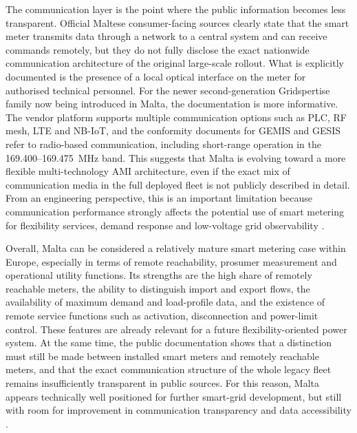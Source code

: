 \documentclass[10pt, a4paper, twoside, twocolumn]{book}
\begin{document}
The communication layer is the point where the public information becomes less transparent. Official Maltese consumer-facing sources clearly state that the smart meter transmits data through a network to a central system and can receive commands remotely, but they do not fully disclose the exact nationwide communication architecture of the original large-scale rollout. What is explicitly documented is the presence of a local optical interface on the meter for authorised technical personnel. For the newer second-generation Gridspertise family now being introduced in Malta, the documentation is more informative. The vendor platform supports multiple communication options such as PLC, RF mesh, LTE and NB-IoT, and the conformity documents for GEMIS and GESIS refer to radio-based communication, including short-range operation in the 169.400--169.475~MHz band. This suggests that Malta is evolving toward a more flexible multi-technology AMI architecture, even if the exact mix of communication media in the full deployed fleet is not publicly described in detail. From an engineering perspective, this is an important limitation because communication performance strongly affects the potential use of smart metering for flexibility services, demand response and low-voltage grid observability \cite{enemalta_smartmeters_faq_2018,arms_smartmeter_manual_2018,gridspertise_residentialmeters_2026,gridspertise_gemis_red_2021,gridspertise_gesis_red_2021}.

Overall, Malta can be considered a relatively mature smart metering case within Europe, especially in terms of remote reachability, prosumer measurement and operational utility functions. Its strengths are the high share of remotely reachable meters, the ability to distinguish import and export flows, the availability of maximum demand and load-profile data, and the existence of remote service functions such as activation, disconnection and power-limit control. These features are already relevant for a future flexibility-oriented power system. At the same time, the public documentation shows that a distinction must still be made between installed smart meters and remotely reachable meters, and that the exact communication structure of the whole legacy fleet remains insufficiently transparent in public sources. For this reason, Malta appears technically well positioned for further smart-grid development, but still with room for improvement in communication transparency and data accessibility \cite{rews_nationalreport_2025,enemalta_services_2026,ewa_necp_2025}.
\end{document}
